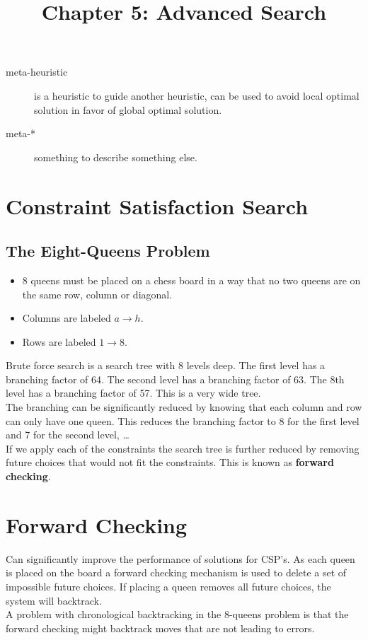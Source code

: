 \documentclass[a4paper]{article}
\begin{document}
	\title{Chapter 5: Advanced Search}
	\maketitle
	\begin{description}
		\item[meta-heuristic] is a heuristic to guide another heuristic, can be used to avoid local
			optimal solution in favor of global optimal solution.
		\item[meta-*] something to describe something else.
	\end{description}
	\section{Constraint Satisfaction Search}
	\subsection{The Eight-Queens Problem}
	\begin{itemize}
		\item 8 queens must be placed on a chess board in a way that no two queens are on the same
			row, column or diagonal.
		\item Columns are labeled $a \to h$.
		\item Rows are labeled $1\to 8$.
	\end{itemize}
	Brute force search is a search tree with 8 levels deep. The first level has a branching factor of 64.
	The second level has a branching factor of 63. The 8th level has a branching factor of 57.
	This is a very wide tree.\\
	The branching can be significantly reduced by knowing that each column and row can only have one queen.
	This reduces the branching factor to 8 for the first level and 7 for the second level, \ldots\\
	If we apply each of the constraints the search tree is further reduced by removing future choices
	that would not fit the constraints. This is known as \textbf{forward checking}.

	\section{Forward Checking}
	Can significantly improve the performance of solutions for CSP's. As each queen is placed on the board
	a forward checking mechanism is used to delete a set of impossible future choices. If placing a queen
	removes all future choices, the system will backtrack.\\
	A problem with chronological backtracking in the 8-queens problem is that the forward checking might
	backtrack moves that are not leading to errors.
	
\end{document}
